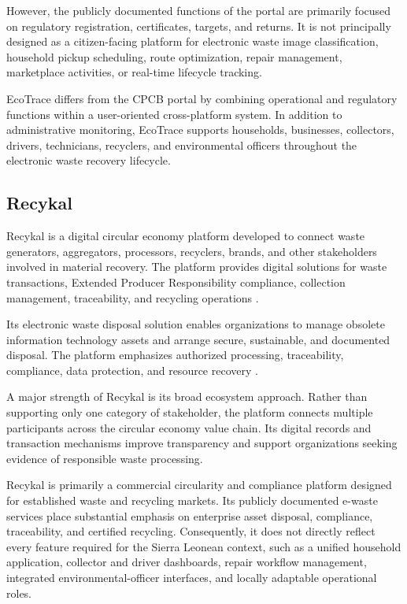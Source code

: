 However, the publicly documented functions of the portal are primarily
focused on regulatory registration, certificates, targets, and returns. It is not
principally designed as a citizen-facing platform for electronic waste image
classification, household pickup scheduling, route optimization, repair
management, marketplace activities, or real-time lifecycle tracking.

EcoTrace differs from the CPCB portal by combining operational and
regulatory functions within a user-oriented cross-platform system. In addition to
administrative monitoring, EcoTrace supports households, businesses, collectors,
drivers, technicians, recyclers, and environmental officers throughout the
electronic waste recovery lifecycle.

\subsection{Recykal}

Recykal is a digital circular economy platform developed to connect waste
generators, aggregators, processors, recyclers, brands, and other stakeholders
involved in material recovery. The platform provides digital solutions for waste
transactions, Extended Producer Responsibility compliance, collection
management, traceability, and recycling operations \citep{recykal2026b}.

Its electronic waste disposal solution enables organizations to manage
obsolete information technology assets and arrange secure, sustainable, and
documented disposal. The platform emphasizes authorized processing,
traceability, compliance, data protection, and resource recovery
\citep{recykal2026a}.

A major strength of Recykal is its broad ecosystem approach. Rather than
supporting only one category of stakeholder, the platform connects multiple
participants across the circular economy value chain. Its digital records and
transaction mechanisms improve transparency and support organizations seeking
evidence of responsible waste processing.

Recykal is primarily a commercial circularity and compliance platform
designed for established waste and recycling markets. Its publicly documented
e-waste services place substantial emphasis on enterprise asset disposal,
compliance, traceability, and certified recycling. Consequently, it does not directly
reflect every feature required for the Sierra Leonean context, such as a unified
household application, collector and driver dashboards, repair workflow
management, integrated environmental-officer interfaces, and locally adaptable
operational roles.

